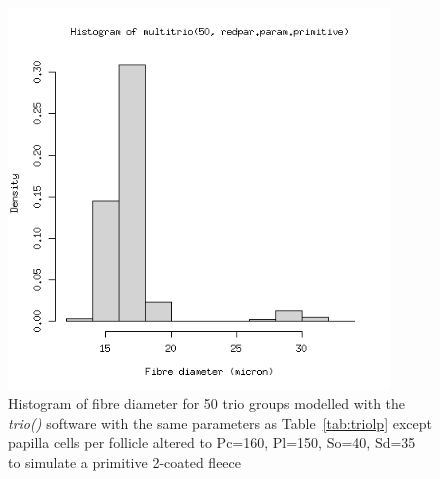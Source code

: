 %

\begin{figure}[h]
  \centering
   \includegraphics[width=0.9\textwidth]{diamhistprimitive.png}
  \caption{Histogram of fibre diameter for 50 trio groups modelled with the {\em trio()} software with the same parameters as Table~\ref{tab:triolp} except papilla cells per follicle altered to Pc=160, Pl=150, So=40, Sd=35 to simulate a primitive 2-coated fleece}
  \label{fig:diamhistprimitive}
\end{figure}

%

